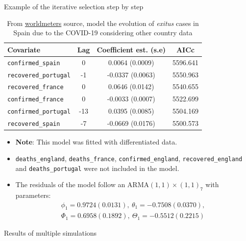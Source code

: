 \documentclass[10pt]{beamer}
\begin{document}
\begin{frame}{Example of the iterative selection step by step}


    \begin{table}
        \centering\small
        \setlength{\tabcolsep}{5pt}
        \caption{From \href{https://www.worldometers.info/coronavirus/}{worldmeters} source, model the evolution of \textit{exitus} cases in Spain due to the COVID-19 considering other country data} 
        \label{covid19}
    
        \begin{tabular}{|l|ccc|}
            \hline
            \textbf{Covariate}           & \textbf{Lag}  & \textbf{Coefficient est. (s.e)} & \textbf{AICc}          \\ 
            \hline 
            \texttt{confirmed\_spain}    & 0             & 0.0064 (0.0009)                 & 5596.641             \\ 
            \texttt{recovered\_portugal} & -1            & -0.0337 (0.0063)                & 5550.963             \\
            \texttt{recovered\_france}   & 0             & 0.0646 (0.0142)                 & 5540.655             \\
            \texttt{confirmed\_france}   & 0             & -0.0033 (0.0007)                & 5522.699             \\
            \texttt{confirmed\_portugal} & -13           & 0.0395 (0.0085)                 & 5504.169             \\
            \texttt{recovered\_spain}    & -7            & -0.0669 (0.0176)                & 5500.573             \\ 
            \hline 
        \end{tabular}
    \end{table}    
    \begin{itemize}
        \item \textbf{Note}: This model was fitted with differentiated data.
        \item \texttt{deaths\_england}, \texttt{deaths\_france}, \texttt{confirmed\_england}, \texttt{recovered\_england} and \texttt{deaths\_portugal} were not included in the model.
        \item The residuals of the model follow an ARMA$(1,1)\times (1,1)_7$ with parameters:
        \[
        \begin{array}{l}
            \phi_1=0.9724 (0.0131), \ \theta_1=-0.7508 (0.0370), \\
            \Phi_1=0.6958 (0.1892), \ \Theta_1=-0.5512 (0.2215)
        \end{array}
        \] 
    \end{itemize}
\end{frame}


\begin{frame}{Results of multiple simulations}

    
    
\end{frame}



\begin{frame}
    
    
\end{frame}
\end{document}
